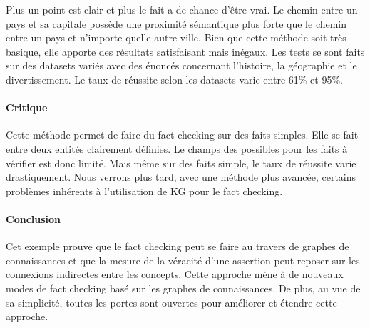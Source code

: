 Plus un point est clair et plus le fait a de chance d'être vrai. Le chemin entre un pays et sa capitale possède une proximité sémantique plus forte que le chemin entre un pays et n'importe quelle autre ville. Bien que cette méthode soit très basique, elle apporte des résultats satisfaisant mais inégaux. Les tests se sont faits sur des datasets variés avec des énoncés concernant l'histoire, la géographie et le divertissement. Le taux de réussite selon les datasets varie entre 61\% et 95\%. 

\paragraph{Critique} Cette méthode permet de faire du fact checking sur des faits simples. Elle se fait entre deux entités clairement définies. Le champs des possibles pour les faits à vérifier est donc limité. Mais même sur des faits simple, le taux de réussite varie drastiquement.
Nous verrons plus tard, avec une méthode plus avancée, certains problèmes inhérents à l'utilisation de KG pour le fact checking.

\paragraph{Conclusion}

Cet exemple prouve que le fact checking peut se faire au travers de graphes de connaissances et que la mesure de la véracité d'une assertion peut reposer sur les connexions indirectes entre les concepts. Cette approche mène à de nouveaux modes de fact checking basé sur les graphes de connaissances. De plus, au vue de sa simplicité, toutes les portes sont ouvertes pour améliorer et étendre cette approche.